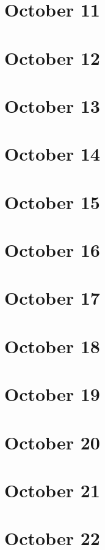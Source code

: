 \section{October 11}

\section{October 12}

\section{October 13}

\section{October 14}

\section{October 15}

\section{October 16}

\section{October 17}

\section{October 18}

\section{October 19}

\section{October 20}

\section{October 21}

\section{October 22}


